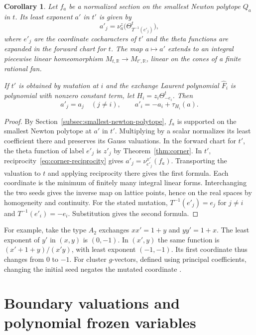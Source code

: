 \documentclass[11pt,reqno]{amsart}
\numberwithin{equation}{section}
\newtheorem{corollary}[theorem]{Corollary}
\theoremstyle{definition}
\theoremstyle{remark}
\begin{document}
\begin{corollary}\label{cor:corner-least-exponent-change}
Let \(f_a\) be a normalized section on the smallest Newton polytope
\(Q_a\) in \(t\). Its least exponent \(a'\) in \(t'\) is given by
\[ a'_j=\nu^z_a\bigl(\Theta^t_{T^{-1}(e'_j)}\bigr), \]
where \(e'_j\) are the coordinate cocharacters of \(t'\) and the
theta functions are expanded in the forward chart for \(t\). The map
\(a\mapsto a'\) extends to an integral piecewise linear homeomorphism
\(M_{t,\mathbb R}\to M_{t',\mathbb R}\), linear on the cones of a
finite rational fan.

If \(t'\) is obtained by mutation at \(i\) and the exchange Laurent
polynomial \(\widehat F_i\) is polynomial with nonzero constant term,
let \(H_i=z_i\Theta^t_{-e_i}\). Then
\[ a'_j=a_j\quad(j\ne i),\qquad a'_i=-a_i+\tau_{H_i}(a). \]
\end{corollary}
\begin{proof}
By Section~\ref{subsec:smallest-newton-polytope}, \(f_a\) is supported
on the smallest Newton polytope at \(a'\) in \(t'\). Multiplying by
a scalar normalizes its least coefficient there and preserves its
Gauss valuations. In the forward chart for \(t'\), the theta function of label \(e'_j\)
is \(z'_j\) by Theorem~\ref{thm:corner}. In \(t'\), reciprocity~\eqref{eq:corner-reciprocity} gives
\(a'_j=\nu^{x'}_{e'_j}(f_a)\). Transporting the valuation to \(t\) and
applying reciprocity there gives the first formula. Each coordinate is
the minimum of finitely many integral linear forms. Interchanging the
two seeds gives the inverse map on lattice points, hence on the real
spaces by homogeneity and continuity. For the stated mutation,
\(T^{-1}(e'_j)=e_j\) for \(j\ne i\) and \(T^{-1}(e'_i)=-e_i\).
Substitution gives the second formula.
\end{proof}

For example, take the type \(A_2\) exchanges \(xx'=1+y\) and
\(yy'=1+x\). The least exponent of \(y'\) in \((x,y)\) is \((0,-1)\).
In \((x',y)\) the same function is \((x'+1+y)/(x'y)\), with least
exponent \((-1,-1)\). Its first coordinate thus changes from \(0\)
to \(-1\). For cluster \(g\)-vectors, defined using principal
coefficients, changing the initial seed negates the mutated coordinate
\cite[Proposition~6.8, (6.15)]{FZIV}.

\section{Boundary valuations and polynomial frozen variables}
\label{sec:boundary-valuations}
\end{document}
